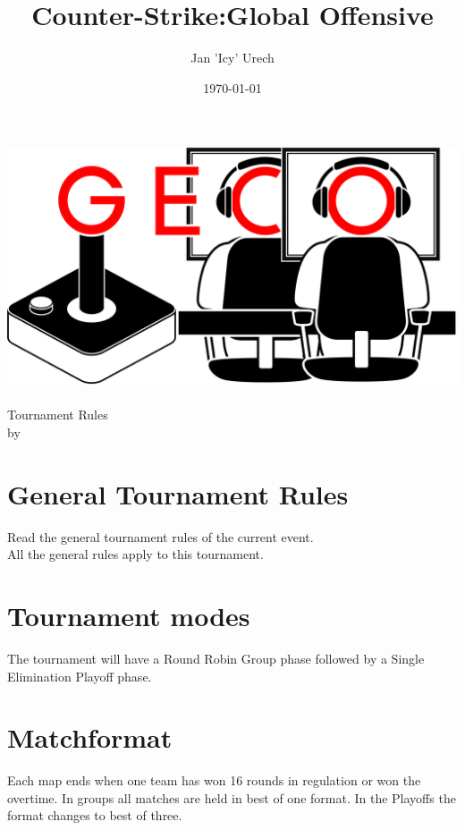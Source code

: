 \documentclass{article}
\title{Counter-Strike:Global Offensive}
\author{Jan 'Icy' Urech }
\date{\today}
\begin{document}
\makeatletter
\begin{titlepage}
\centering
\includegraphics[scale=0.075]{../img/GECo.png}\\
\LARGE \@title\\ Tournament Rules\\ \normalsize by \@author\\ \@date
\end{titlepage}
\makeatother


\clearpage

\tableofcontents
\clearpage

\section{General Tournament Rules}
Read the general tournament rules of the current event.\\
All the general rules apply to this tournament.


\section{Tournament modes}
The tournament will have a Round Robin Group phase followed by a Single Elimination Playoff phase.

\section{Matchformat}
Each map ends when one team has won 16 rounds in regulation or won the overtime.
In groups all matches are held in best of one format. In the Playoffs the format changes to best of three.
\end{document}
